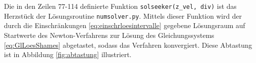 \documentclass[a4paper,12pt]{article}
\numberwithin{equation}{section}
\begin{document}
Die in den Zeilen 77-114 definierte Funktion \verb|solseeker(z_vel, div)| ist das Herzstück der Lösungsroutine \verb|numsolver.py|. Mittels dieser Funktion wird der durch die Einschränkungen \eqref{eq:einschrloesintervalle} gegebene Lösungsraum auf Startwerte des Newton-Verfahrens zur Lösung des Gleichungssystems \eqref{eq:GlLoesShames} abgetastet, sodass das Verfahren konvergiert. Diese Abtastung ist in Abbildung \ref{fig:abtastung} illustriert. 
\begin{figure}[h]
\centering



\begin{tikzpicture}[x=0.75pt,y=0.75pt,yscale=-1,xscale=1]


\end{tikzpicture}
\end{figure}
\end{document}
